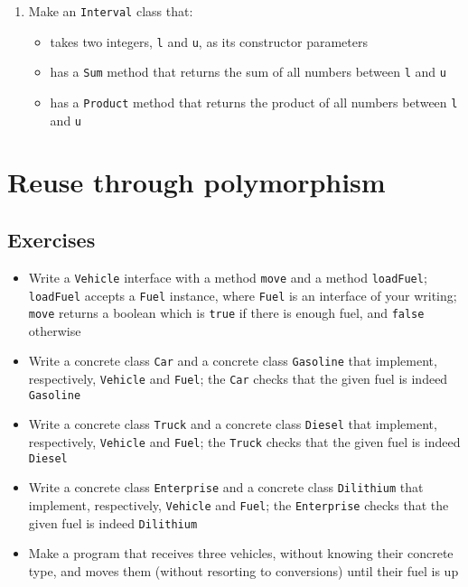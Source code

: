 \begin{enumerate}
            \item Make an \texttt{Interval} class that:
            \begin{itemize}
                \item takes two integers, \texttt{l} and \texttt{u}, as its constructor parameters
                \item has a \texttt{Sum} method that returns the sum of all numbers between \texttt{l} and \texttt{u}
                \item has a \texttt{Product} method that returns the product of all numbers between \texttt{l} and \texttt{u}
            \end{itemize}
        \end{enumerate}



\chapter{Reuse through polymorphism}
    \section{Exercises}
        \begin{itemize}
            \item Write a \texttt{Vehicle} interface with a method \texttt{move} and a method \texttt{loadFuel}; \texttt{loadFuel} accepts a \texttt{Fuel} instance, where \texttt{Fuel} is an interface of your writing; \texttt{move} returns a boolean which is \texttt{true} if there is enough fuel, and \texttt{false} otherwise
            \item Write a concrete class \texttt{Car} and a concrete class \texttt{Gasoline} that implement, respectively, \texttt{Vehicle} and \texttt{Fuel}; the \texttt{Car} checks that the given fuel is indeed \texttt{Gasoline}
            \item Write a concrete class \texttt{Truck} and a concrete class \texttt{Diesel} that implement, respectively, \texttt{Vehicle} and \texttt{Fuel}; the \texttt{Truck} checks that the given fuel is indeed \texttt{Diesel}
            \item Write a concrete class \texttt{Enterprise} and a concrete class \texttt{Dilithium} that implement, respectively, \texttt{Vehicle} and \texttt{Fuel}; the \texttt{Enterprise} checks that the given fuel is indeed \texttt{Dilithium}
            \item Make a program that receives three vehicles, without knowing their concrete type, and moves them (without resorting to conversions) until their fuel is up
        \end{itemize}

